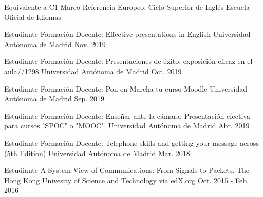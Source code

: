
\begin{cventries}

\cventry
{Equivalente a C1 Marco Referencia Europeo.}
{Ciclo Superior de Inglés}
{Escuela Oficial de Idiomas}
{}
{}

  \cventry
    {Estudiante} %
    {Formación Docente: Effective presentations in English} %
    {Universidad Autónoma de Madrid} %
    {Nov. 2019} %
    {
    }

  \cventry
    {Estudiante} %
    {Formación Docente: Presentaciones de éxito: exposición eficaz en el aula//1298} %
    {Universidad Autónoma de Madrid} %
    {Oct. 2019} %
    {
    }

  \cventry
    {Estudiante} %
    {Formación Docente: Pon en Marcha tu curso Moodle} %
    {Universidad Autónoma de Madrid} %
    {Sep. 2019} %
    {
    }

  \cventry
    {Estudiante} %
    {Formación Docente: Enseñar ante la cámara: Presentación efectiva para cursos "SPOC" o
"MOOC".} %
    {Universidad Autónoma de Madrid} %
    {Abr. 2019} %
    {
    }
    
  \cventry
    {Estudiante} %
    {Formación Docente: Telephone skills and getting your message across (5th Edition)} %
    {Universidad Autónoma de Madrid} %
    {Mar. 2018} %
    {
    }


  \cventry
    {Estudiante} %
    {A System View of Communications: From Signals to Packets.} %
    {The Hong Kong Univesity of Science and Technology via edX.org} %
    {Oct. 2015 - Feb. 2016} %
    {
    }
    

\end{cventries}
